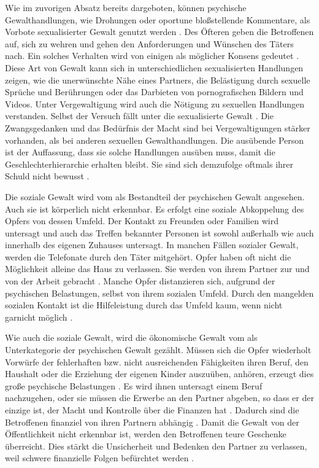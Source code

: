 Wie im zuvorigen Absatz bereits dargeboten, können psychische Gewalthandlungen, wie Drohungen oder oportune bloßstellende Kommentare, als Vorbote sexualisierter Gewalt genutzt werden \parencite{Übergang_psy_zu_sex_Gewalt}. Des Öfteren geben die Betroffenen auf, sich zu wehren und gehen den Anforderungen und Wünschen des Täters nach. Ein solches Verhalten wird von einigen als möglicher Konsens gedeutet \parencite{Def_haus_Gewalt_2}. Diese Art von Gewalt kann sich in unterschiedlichen sexualisierten Handlungen zeigen, wie die unerwünschte Nähe eines Partners, die Belästigung durch sexuelle Sprüche und Berührungen oder das Darbieten von pornografischen Bildern und Videos. Unter Vergewaltigung wird auch die Nötigung zu sexuellen Handlungen verstanden. Selbst der Versuch fällt unter die sexualisierte Gewalt \parencite{Def_haus_Gewalt_2, Gewaltart, Def_Form_Folge_Gewalt}. Die Zwangsgedanken und das Bedürfnis der Macht sind bei Vergewaltigungen stärker vorhanden, als bei anderen sexuellen Gewalthandlungen. Die ausübende Person ist der Auffassung, dass sie solche Handlungen ausüben muss, damit die Geschlechterhierarchie erhalten bleibt. Sie sind sich demzufolge oftmals ihrer Schuld nicht bewusst \parencite{Def_haus_Gewalt_2}.

Die soziale Gewalt wird vom \textcite{Def_Form_Folge_Gewalt} als Bestandteil der psychischen Gewalt angesehen. Auch sie ist körperlich nicht erkennbar. Es erfolgt eine soziale Abkoppelung des Opfers von dessen Umfeld. Der Kontakt zu Freunden oder Familien wird untersagt und auch das Treffen bekannter Personen ist sowohl außerhalb wie auch innerhalb des eigenen Zuhauses untersagt. In manchen Fällen sozialer Gewalt, werden die Telefonate durch den Täter mitgehört. Opfer haben oft nicht die Möglichkeit alleine das Haus zu verlassen. Sie werden von ihrem Partner zur und von der Arbeit gebracht \parencite{Def_haus_Gewalt_2, Def_Form_Folge_Gewalt}. Manche Opfer distanzieren sich, aufgrund der psychischen Belastungen, selbst von ihrem sozialen Umfeld. Durch den mangelden sozialen Kontakt ist die Hilfeleistung durch das Umfeld kaum, wenn nicht garnicht möglich \parencite{Def_haus_Gewalt_2}.

Wie auch die soziale Gewalt, wird die ökonomische Gewalt vom \textcite{Def_Form_Folge_Gewalt} als Unterkategorie der psychischen Gewalt gezählt. Müssen sich die Opfer wiederholt Vorwürfe der fehlerhaften bzw. nicht ausreichenden Fähigkeiten ihren Beruf, den Haushalt oder die Erziehung der eigenen Kinder auszuüben, anhören, erzeugt dies große psychische Belastungen \parencite{Def_haus_Gewalt_2}. Es wird ihnen untersagt einem Beruf nachzugehen, oder sie müssen die Erwerbe an den Partner abgeben, so dass er der einzige ist, der Macht und Kontrolle über die Finanzen hat \parencite{Def_haus_Gewalt_2, Def_Form_Folge_Gewalt}. Dadurch sind die Betroffenen finanziel von ihren Partnern abhängig \parencite{physische_Gewalt_wie_aggro}. Damit die Gewalt von der Öffentlichkeit nicht erkennbar ist, werden den Betroffenen teure Geschenke überreicht. Dies stärkt die Unsicherheit und Bedenken den Partner zu verlassen, weil schwere finanzielle Folgen befürchtet werden \parencite{Übergang_psy_zu_sex_Gewalt}.

